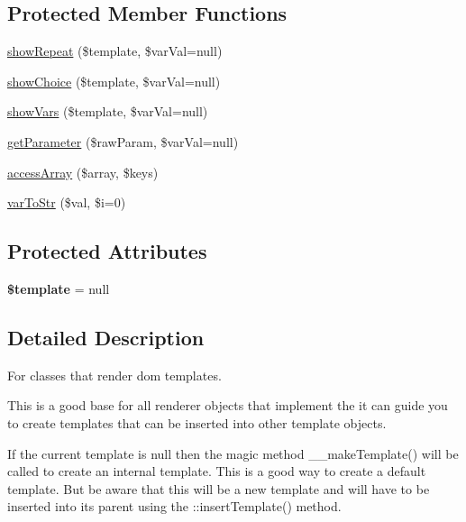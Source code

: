 \subsection*{Protected Member Functions}
\begin{DoxyCompactItemize}
\item 
\hyperlink{classDom_1_1Renderer_1_1AutoRenderer_a3b70adccf8b6bfe1f1cea70f9f5b61c1}{show\+Repeat} (\$template, \$var\+Val=null)
\item 
\hyperlink{classDom_1_1Renderer_1_1AutoRenderer_a2a0ec28ecc71a00879f8eb5b01f2d757}{show\+Choice} (\$template, \$var\+Val=null)
\item 
\hyperlink{classDom_1_1Renderer_1_1AutoRenderer_a22152a42a4755f4cea0cdc35ca7da5ca}{show\+Vars} (\$template, \$var\+Val=null)
\item 
\hyperlink{classDom_1_1Renderer_1_1AutoRenderer_af00edcb9f6d79f99f3b29fb4e4f47f05}{get\+Parameter} (\$raw\+Param, \$var\+Val=null)
\item 
\hyperlink{classDom_1_1Renderer_1_1AutoRenderer_a33948b5b6b5168f0b33c9f3c59f9ad70}{access\+Array} (\$array, \$keys)
\item 
\hyperlink{classDom_1_1Renderer_1_1AutoRenderer_ac9a3ade75e9579add0a93c613ab4b822}{var\+To\+Str} (\$val, \$i=0)
\end{DoxyCompactItemize}
\subsection*{Protected Attributes}
\begin{DoxyCompactItemize}
\item 
\hypertarget{classDom_1_1Renderer_1_1AutoRenderer_a73b9fa3881a3433725dde8340265c2ff}{{\bfseries \$template} = null}\label{classDom_1_1Renderer_1_1AutoRenderer_a73b9fa3881a3433725dde8340265c2ff}

\end{DoxyCompactItemize}


\subsection{Detailed Description}
For classes that render dom templates.

This is a good base for all renderer objects that implement the  it can guide you to create templates that can be inserted into other template objects.

If the current template is null then the magic method \+\_\+\+\_\+make\+Template() will be called to create an internal template. This is a good way to create a default template. But be aware that this will be a new template and will have to be inserted into its parent using the \+::insert\+Template() method.

